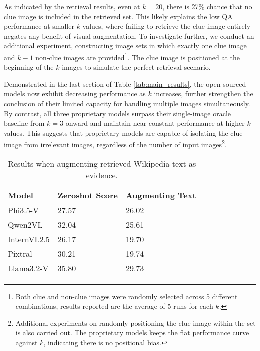 As indicated by the retrieval results, even at $k=20$, there is 27\% chance that no clue image is included in the retrieved set. This likely explains the low QA performance at smaller $k$ values, where failing to retrieve the clue image entirely negates any benefit of visual augmentation.
To investigate further, we conduct an additional experiment, constructing image sets in which exactly one clue image and $k-1$ non-clue images are provided\footnote{Both clue and non-clue images were randomly selected across 5 different combinations, results reported are the average of 5 runs for each $k$.}. The clue image is positioned at the beginning of the $k$ images to simulate the perfect retrieval scenario.

Demonstrated in the last section of Table \ref{tab:main_results}, the open-sourced models now exhibit decreasing performance as $k$ increases, further strengthen the conclusion of their limited capacity for handling multiple images simultaneously. By contrast, all three proprietary models surpass their single-image oracle baseline from $k=3$ onward and maintain near-constant performance at higher $k$ values. This suggests that proprietary models are capable of isolating the clue image from irrelevant images, regardless of the number of input images\footnote{Additional experiments on randomly positioning the clue image within the set is also carried out. The proprietary models keeps the flat performance curve against $k$, indicating there is no positional bias.}.


\begin{table}[h]
    \centering
    \small
    \begin{tabular}{l|p{4em}p{5em}}
    \toprule
         Model& Zeroshot Score & Augmenting Text \\
         \midrule
         Phi3.5-V   &27.57  & 26.02\\
         Qwen2VL    &32.04  & 25.61\\
         InternVL2.5   &26.17  & 19.70\\
         Pixtral    &30.21  & 19.74\\
         Llama3.2-V &35.80  & 29.73\\
    \bottomrule
    \end{tabular}
    \setlength{\belowcaptionskip}{-0.3em}
    \caption{Results when augmenting retrieved Wikipedia text as evidence.}
    \label{tab:aug_text}
\end{table}


